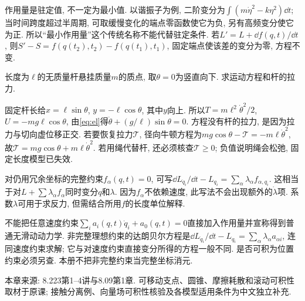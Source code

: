 作用量是驻定值, 不一定为最小值. 以谐振子为例, 二阶变分为$\int(m\dot\eta^2-k\eta^2)\dd t$; 当时间跨度超过半周期, 可取缓慢变化的端点零函数使它为负, 另有高频变分使它为正. 所以“最小作用量”这个传统名称不能代替驻定条件. 若$L'=L+\dd f(q,t)/\dd t$, 则$S'-S=f(q(t_2),t_2)-f(q(t_1),t_1)$, 固定端点使该差的变分为零, 方程不变.

\begin{example}
长度为$\ell$的无质量杆悬挂质量$m$的质点, 取$\theta=0$为竖直向下. 求运动方程和杆的拉力.
\end{example}
\begin{solution}
固定杆长给$x=\ell\sin\theta$, $y=-\ell\cos\theta$, 其中$y$向上. 所以$T=m\ell^2\dot\theta^2/2$, $U=-mg\ell\cos\theta$, 由\eqref{eq:el}得$\ddot\theta+(g/\ell)\sin\theta=0$. 方程没有杆的拉力, 是因为拉力与切向虚位移正交. 若要恢复拉力$\mathcal T$, 径向牛顿方程为$mg\cos\theta-\mathcal T=-m\ell\dot\theta^2$, 故$\mathcal T=mg\cos\theta+m\ell\dot\theta^2$. 若用绳代替杆, 还必须核查$\mathcal T\ge0$; 负值说明绳会松弛, 固定长度模型已失效.
\end{solution}
对仍用冗余坐标的完整约束$f_\alpha(q,t)=0$, 可写$\dd L_{\dot q_i}/\dd t-L_{q_i}=\sum_\alpha\lambda_\alpha f_{\alpha,q_i}$. 这相当于对$L+\sum\lambda_\alpha f_\alpha$同时变分$q$和$\lambda$. 因为$f_\alpha$不依赖速度, 此写法不会出现额外的$\dot\lambda$项. 系数$\lambda$可用于求反力, 但需结合所用$f$的长度单位解释.

\begin{remark}
不能把任意速度约束$\sum_i a_i(q,t)\dot q_i+a_0(q,t)=0$直接加入作用量并宣称得到普通无滑动动力学. 非完整理想约束的达朗贝尔方程是$\dd L_{\dot q_i}/\dd t-L_{q_i}=\sum_\alpha\lambda_\alpha a_{\alpha i}$, 连同速度约束求解; 它与对速度约束直接变分所得的方程一般不同. 是否可积为位置约束必须另查. 本册不把非完整约束当完整坐标消元.
\end{remark}


本章来源: 8.223第1--4讲与8.09第1章. 可移动支点、圆锥、摩擦耗散和滚动可积性取材于原课; 接触分离例、向量场可积性核验及各模型适用条件为中文独立补充.
